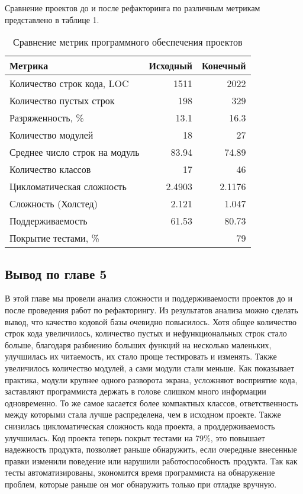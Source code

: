     Сравнение проектов до и после рефакторинга по различным метрикам представлено в таблице 1.
    \begin{table}[H]
        \caption{Сравнение метрик программного обеспечения проектов}
        \begin{center}
            \begin{tabular}{l|r|r}
                \textbf{Метрика} & \textbf{Исходный} & \textbf{Конечный} \\
                \hline
                Количество строк кода, LOC    & 1511    & 2022 \\
                Количество пустых строк       & 198     & 329 \\
                Разряженность, \%             & 13.1    & 16.3 \\
                Количество модулей            & 18      & 27 \\
                Среднее число строк на модуль & 83.94   & 74.89 \\
                Количество классов            & 17      & 46 \\
                Цикломатическая сложность     & 2.4903  & 2.1176 \\
                Сложность (Холстед)           & 2.121   & 1.047 \\
                Поддерживаемость              & 61.53   & 80.73 \\
                Покрытие тестами, \%          &         & 79 \\
            \end{tabular}
        \end{center}
    \end{table}

    \subsection*{Вывод по главе 5}
    В этой главе мы провели анализ сложности и поддерживаемости проектов
    до и после проведения работ по рефакторингу. Из результатов анализа
    можно сделать вывод, что качество кодовой базы очевидно повысилось.
    Хотя общее количество строк кода увеличилось, количество пустых и
    нефункциональных строк стало больше, благодаря разбиению больших функций
    на несколько маленьких, улучшилась их читаемость, их стало проще тестировать
    и изменять.
    Также увеличилось количество модулей, а сами модули стали меньше.
    Как показывает практика, модули крупнее одного разворота экрана, усложняют
    восприятие кода, заставляют программиста держать в голове слишком много
    информации одновременно.
    То же самое касается более компактных классов, ответственность между которыми
    стала лучше распределена, чем в исходном проекте.
    Также снизилась цикломатическая сложность кода проекта, а проддерживаемость
    улучшилась.
    Код проекта теперь покрыт тестами на 79\%, это повышает надежность продукта,
    позволяет раньше обнаружить, если очередные внесенные правки
    изменили поведение или нарушили работоспособность продукта.
    Так как тесты автоматизированы, экономится время программиста на обнаружение
    проблем, которые раньше он мог обнаружить только при отладке вручную.
